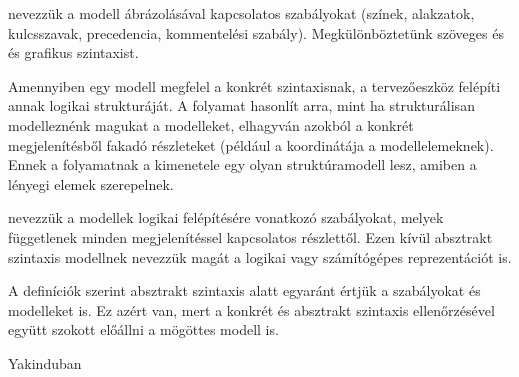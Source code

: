 \begin{definicio}
 nevezzük a modell ábrázolásával kapcsolatos szabályokat (színek,  alakzatok, kulcsszavak, precedencia, kommentelési szabály). Megkülönböztetünk szöveges és és grafikus szintaxist.
\end{definicio}

Amennyiben egy modell megfelel a konkrét szintaxisnak, a tervezőeszköz felépíti annak logikai strukturáját. A folyamat hasonlít arra, mint ha strukturálisan modelleznénk magukat a modelleket, elhagyván azokból a konkrét megjelenítésből fakadó részleteket (például a koordinátája a modellelemeknek). Ennek a folyamatnak a kimenetele egy olyan struktúramodell lesz, amiben a lényegi elemek szerepelnek.

\begin{definicio}
 nevezzük a modellek logikai felépítésére vonatkozó szabályokat, melyek függetlenek minden megjelenítéssel kapcsolatos részlettől. Ezen kívül absztrakt szintaxis modellnek nevezzük magát a logikai vagy számítógépes reprezentációt is.
\end{definicio}

A definíciók szerint absztrakt szintaxis alatt egyaránt értjük a szabályokat és modelleket is. Ez azért van, mert a konkrét és absztrakt szintaxis ellenőrzésével együtt szokott előállni a mögöttes modell is. 

\begin{pelda}
Yakinduban 
\end{pelda}




